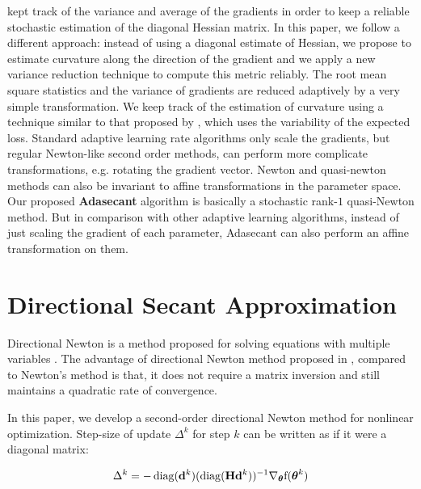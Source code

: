 \documentclass{article}
\begin{document}
\cite{schaul2012no} kept track of the variance and average of the gradients in order to keep a 
reliable stochastic estimation of the diagonal Hessian matrix. In this paper, we follow a different approach: instead of using
a diagonal estimate of Hessian, we propose to estimate curvature along the direction of the
gradient and we apply a new variance reduction technique to compute this metric reliably. The root mean square
statistics and the variance of gradients are reduced adaptively by a very simple transformation. We keep
track of the estimation of curvature using a technique similar to that proposed by \cite{schaul2012no},
which uses the variability of the expected loss. Standard adaptive learning rate
algorithms only scale the gradients, but regular Newton-like second order methods, can perform
more complicate transformations, e.g. rotating the gradient vector. Newton and quasi-newton
methods can also be invariant to affine transformations in the parameter space. Our proposed
\textbf{Adasecant} algorithm is basically a stochastic rank-$1$ quasi-Newton method. But in comparison with other adaptive
learning algorithms, instead of just scaling the gradient of each parameter, Adasecant can also perform an affine
transformation on them.

\section{Directional Secant Approximation}
\label{sec:dir_sec_approx}

Directional Newton is a method proposed for solving equations with multiple variables
\citep{levin2002directional}.  The advantage of directional Newton method proposed in
\cite{levin2002directional}, compared to Newton's method is that, it does not require 
a matrix inversion and still maintains a quadratic rate of  convergence.



In this paper, we develop a second-order directional Newton method for nonlinear optimization.
Step-size of update $\Delta^k$ for step $k$ can be written as if it were a diagonal matrix:

\begin{equation}
\label{eqn:dir_newton}
\Delta^k = - \operatorname{diag}(\mathbf{d}^k)(\operatorname{diag}({\mathbf H} \mathbf{d}^k))^{-1} \nabla_{{\boldsymbol{\theta}}} \text{f}({\boldsymbol{\theta}}^k)
\end{equation}
\end{document}
